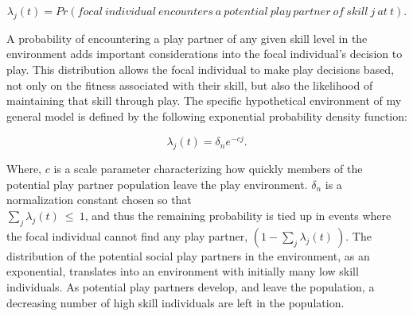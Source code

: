 \documentclass[12pt,letterpaper]{article}
\begin{document}
      \begin{equation}
      \lambda_j(t)=Pr(focal~ individual~ encounters~ a~ potential~ play~ partner~ of~ skill~ j~ at~ t).
      \end{equation} 
      
      A probability of encountering a play partner of any given skill level in the environment adds important considerations into the focal individual's decision to play.
      This distribution allows the focal individual to make play decisions based, not only on the fitness associated with their skill, but also the likelihood of maintaining that skill through play. %
      The specific hypothetical environment of my general model is defined by the following exponential probability density function:       
      
      \begin{equation}
      \lambda_j(t) = \delta_n e^{-cj}.
      \label{lambda_j}
      \end{equation}
      
      Where, $c$ is a scale parameter characterizing how quickly members of the potential play partner population leave the play environment.
      $\delta_n$ is a normalization constant chosen so that \\$\sum_j \lambda_j(t)~\le~1$, and thus the remaining  probability is tied up in events where the focal individual cannot find any play partner, $(1-\sum_j \lambda_j(t)~)$. %
      The distribution of the potential social play partners in the environment, as an exponential, translates into an environment with initially many low skill individuals.
      As potential play partners develop, and leave the population, a decreasing number of high skill individuals are left in the population. %
      
      
\end{document}

